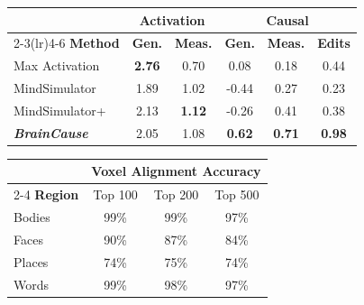 \begin{figure}[t]
\centering

\begin{minipage}[t]{0.50\textwidth}
\centering
\small
\renewcommand{\arraystretch}{1.25}
\setlength{\tabcolsep}{3pt}


\label{tab:quant_main}

\vspace{0.05cm}

\begin{tabular}{@{}lccccc@{}}
\toprule
& \multicolumn{2}{c}{\textbf{Activation}}
& \multicolumn{3}{c}{\textbf{Causal}} \\
\cmidrule(lr){2-3}\cmidrule(lr){4-6}
\textbf{Method}
& \textbf{Gen.}
& \textbf{Meas.}
& \textbf{Gen.}
& \textbf{Meas.}
& \textbf{Edits} \\
\midrule
Max Activation
& \textbf{2.76} & 0.70 & 0.08 & 0.18 & 0.44 \\
MindSimulator
& 1.89 & 1.02 & -0.44 & 0.27 & 0.23 \\
MindSimulator+
& 2.13 & \textbf{1.12} & -0.26 & 0.41 & 0.38 \\
\emph{\textbf{BrainCause}}
& 2.05 & 1.08 & \textbf{0.62} & \textbf{0.71} & \textbf{0.98} \\
\bottomrule
\end{tabular}

\end{minipage}\hfill%
\begin{minipage}[t]{0.47\textwidth}
\centering
\small
\renewcommand{\arraystretch}{1.25}
\setlength{\tabcolsep}{10pt}

\label{tab:known_roi_sanity}

\vspace{0.05cm}

\begin{tabular}{@{}lccc@{}}
\toprule
& \multicolumn{3}{c}{\textbf{Voxel Alignment Accuracy}} \\
\cmidrule(l){2-4}
\textbf{Region} & Top 100 & Top 200 & Top 500 \\
\midrule
Bodies & 99\% & 99\% & 97\% \\
Faces  & 90\% & 87\% & 84\% \\
Places & 74\% & 75\% & 74\% \\
Words  & 99\% & 98\% & 97\% \\
\bottomrule
\end{tabular}

\end{minipage}

\end{figure}